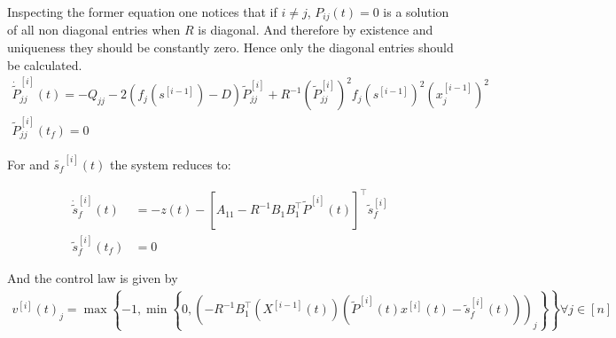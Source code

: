 \documentclass[3p,times]{article}
\begin{document}
Inspecting the former equation one notices that if $i\neq j$, $P_{ij}(t) = 0$ is a solution of all non diagonal entries when $R$ is diagonal. And therefore by existence and uniqueness they should be constantly zero. Hence only the diagonal entries should be calculated. 
\begin{align}
\dot{\tilde{P}}^{[i]}_{jj}(t)= -Q_{jj}- 2 \left(f_j\left(s^{[i-1]}\right)- D \right)\tilde{P}^{[i]}_{jj} + R^{-1}\left(\tilde{P}^{[i]}_{jj}\right)^2f_j\left(s^{[i-1]}\right)^2\left(x^{[i-1]}_j\right)^2  \\
\tilde{P}^{[i]}_{jj}(t_f) = 0
\end{align}

For and  $\tilde{s_f}^{[i]}(t)$ the system reduces to:

\begin{align}
\dot{\tilde{s}}_f^{[i]}(t) &= -z(t)- \left[A_{11} -R^{-1}B_1B_1^\top \tilde{P}^{[i]}(t) \right]^\top \tilde{s}_f^{[i]} \\
\tilde{s}_f^{[i]}(t_f) &= 0
\end{align}

And the control law is given by
\begin{align}
v^{[i]}(t)_j = \max \left\{ -1,\min\left\{0,\left( -R^{-1}B_1^\top\left(X^{[i-1]}(t)\right)\left(\tilde{P}^{[i]}(t)x^{[i]}(t)-\tilde{s}_f^{[i]}(t)\right)\right)_j \right\}\right\} \forall j \in [n]
\end{align} 
\end{document}
